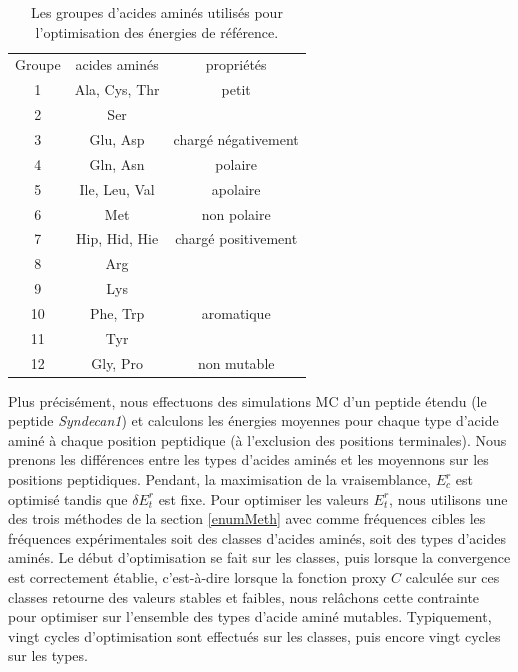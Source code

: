     \begin{table}[!htbp]
      \centering

      \begin{tabular}{ccc}

        \toprule
        Groupe & acides aminés & propriétés\\
        \cmidrule{1-3}

        1   & Ala, Cys, Thr & petit\\
        2   & Ser &\\
        \cmidrule{1-3}
        3   & Glu, Asp & chargé négativement\\
        \cmidrule{1-3}
        4   & Gln, Asn & polaire\\
        \cmidrule{1-3}
        5   & Ile, Leu, Val & apolaire\\
        \cmidrule{1-3}
        6   & Met & non polaire\\
        \cmidrule{1-3}
        7   & Hip, Hid, Hie & chargé positivement\\
        8   & Arg \\
        9   & Lys \\
        \cmidrule{1-3}
        10  & Phe, Trp & aromatique\\
        11  & Tyr \\
        \cmidrule{1-3}
        12  & Gly, Pro & non mutable\\
        \bottomrule


      \end{tabular}      
      \caption{Les groupes d'acides aminés utilisés pour l'optimisation des énergies de référence.}
\label{tab:AAgroups}      
    \end{table}

Plus précisément, nous effectuons des simulations MC d'un peptide étendu (le peptide \textit{Syndecan1}) et calculons les énergies moyennes pour chaque type d'acide aminé à chaque position peptidique (à l'exclusion des positions terminales). Nous prenons les différences entre les types d'acides aminés et les moyennons sur les positions peptidiques.
Pendant, la maximisation de la vraisemblance, $E_c^r$ est optimisé tandis que $\delta E_t^r$ est fixe. Pour optimiser les valeurs $E^r_t$, nous utilisons une des trois méthodes de la section \ref{enumMeth} avec comme fréquences cibles les fréquences expérimentales soit des classes d'acides aminés, soit des types d'acides aminés. Le  début d'optimisation se fait sur les classes, puis lorsque la convergence est correctement établie, c'est-à-dire lorsque la fonction proxy $C$ calculée sur ces classes retourne des valeurs stables et faibles, nous relâchons cette contrainte pour optimiser sur l'ensemble des types d'acide aminé mutables. Typiquement, vingt cycles d'optimisation sont effectués sur les classes, puis encore vingt cycles sur les types.  

